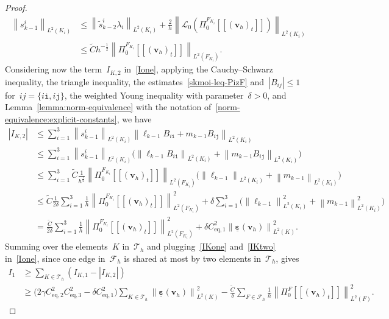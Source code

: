 \documentclass[a4paper,twoside,10pt]{article}
\theoremstyle{plain}
\theoremstyle{remark}
\theoremstyle{definition}
\numberwithin{equation}{section}
\numberwithin{figure}{section}
\newcommand{\Norm}[1]{{\left\|{#1} \right\|}}
\newcommand{\jump}[1]{\left[\!\left[#1\right]\!\right]}
\newcommand{\Tauh}{\mathcal{T}_h}
\newcommand{\K}{K}
\newcommand{\F}{F}
\newcommand{\vbfh}{\mathbf{v}_h}
\newcommand{\tangscalar}{t}
\newcommand{\Ltwo}{L^2}
\newcommand{\Fcalh}{\mathcal{F}_h}
\newcommand{\epsbfun}{\underline{\boldsymbol{\varepsilon}}}
\newcommand{\stildekmt}{\widetilde{s}_{k-2}}
\newcommand{\stildekmti}{\stildekmt^i}
\newcommand{\lambdai}{\lambda_i}
\newcommand{\skmoi}{s_{k-1}^i}
\newcommand{\lkmo}{\ell_{k-1}}
\newcommand{\mkmo}{m_{k-1}}
\newcommand{\Ki}{{\K_i}}
\newcommand{\Fi}{{\F_{\Ki}}}
\newcommand{\itt}{\mathtt{i}}
\newcommand{\jtt}{\mathtt{j}}
\newcommand{\PizF}{\Pi_0^{\F}}
\newcommand{\PizFi}{\Pi_0^{\Fi}}
\newcommand{\Ione}{I_1}
\newcommand{\Ctilde}{\widetilde{C}}
\newcommand{\Ceqone}{C_{\text{eq},1}}
\newcommand{\Ceqtwo}{C_{\text{eq},2}}
\newcommand{\Ceqthree}{C_{\text{eq},3}}
\newcommand{\IKone}{I_{\K,1}}
\newcommand{\IKtwo}{I_{\K,2}}
\newcommand{\Lcalzero}{\mathcal{L}_0}
\begin{document}
\begin{proof}
\begin{equation}
\begin{split}
\Norm{\skmoi}_{\Ltwo(\Ki)}
&\leq\Norm{\stildekmti\lambdai}_{\Ltwo(\Ki)} + \frac{2}{h}\Norm{\Lcalzero(\PizFi\jump{(\vbfh)_{\tangscalar}})}_{\Ltwo(\Ki)} \\
&\leq \Ctilde h^{-\frac12}\Norm{\PizFi\jump{(\vbfh)_{\tangscalar}}}_{\Ltwo(\Fi)}.
\end{split}
\end{equation}
Considering now the term~$\IKtwo$ in~\eqref{Ione},
applying the Cauchy--Schwarz inequality,
the triangle inequality,
the estimates~\eqref{skmoi-leq-PizF}
and~$|B_{ij}| \leq 1$ for~$ij = \{i\itt,i\jtt\}$,
the weighted Young inequality with parameter~$\delta > 0$,
and Lemma~\ref{lemma:norm-equivalence}
with the notation of~\eqref{norm-equivalence:explicit-constants},
we have
\begin{equation} \label{IKtwo}
\begin{split}
|\IKtwo|
&\leq \sum_{i=1}^3 \Norm{\skmoi}_{\Ltwo(\Ki)} \Norm{\lkmo B_{i\itt} + \mkmo B_{i\jtt}}_{\Ltwo(\Ki)} \\
&\leq \sum_{i=1}^3 \Norm{\skmoi}_{\Ltwo(\Ki)} \big(\Norm{\lkmo B_{i\itt}}_{\Ltwo(\Ki)} + \Norm{\mkmo B_{i\jtt}}_{\Ltwo(\Ki)}\big) \\
&\leq \sum_{i=1}^3 \Ctilde \frac{1}{h^{\frac12}} \Norm{\PizFi\jump{(\vbfh)_{\tangscalar}}}_{\Ltwo(\Fi)} \big(\Norm{\lkmo}_{\Ltwo(\Ki)} + \Norm{\mkmo}_{\Ltwo(\Ki)}\big) \\
&\leq \Ctilde\frac{1}{2\delta}\sum_{i=1}^3 \frac{1}{h} \Norm{\PizFi\jump{(\vbfh)_{\tangscalar}}}^2_{\Ltwo(\Fi)}
        + \delta\sum_{i=1}^3 \big(\Norm{\lkmo}_{\Ltwo(\Ki)}^2 + \Norm{\mkmo}_{\Ltwo(\Ki)}^2\big) \\
&= \frac{\Ctilde}{2\delta}\sum_{i=1}^3 \frac{1}{h} \Norm{\PizFi\jump{(\vbfh)_{\tangscalar}}}^2_{\Ltwo(\Fi)}
        + \delta\Ceqone^2\Norm{\epsbfun(\vbfh)}_{\Ltwo(\K)}^2.
\end{split}
\end{equation}
Summing over the elements~$\K$ in~$\Tauh$
and plugging~\eqref{IKone} and~\eqref{IKtwo} in~\eqref{Ione},
since one edge in~$\Fcalh$ is shared at most by two elements in~$\Tauh$,
gives
\begin{equation} \label{Ione-final}
\begin{split}
\Ione
&\geq \sum_{\K\in \Tauh}(\IKone - |\IKtwo|) \\
&\geq \Big(2\gamma\Ceqtwo^2\Ceqthree^2-\delta\Ceqone^2\Big) \sum_{\K\in \Tauh} \Norm{\epsbfun(\vbfh)}_{\Ltwo(\K)}^2
            - \frac{\Ctilde}{\delta}\sum_{\F\in\Fcalh}\frac{1}{h}{\Norm{\PizF\jump{(\vbfh)_{\tangscalar}}}}_{\Ltwo(\F)}^2.
\end{split}
\end{equation}



\end{proof}
\end{document}
